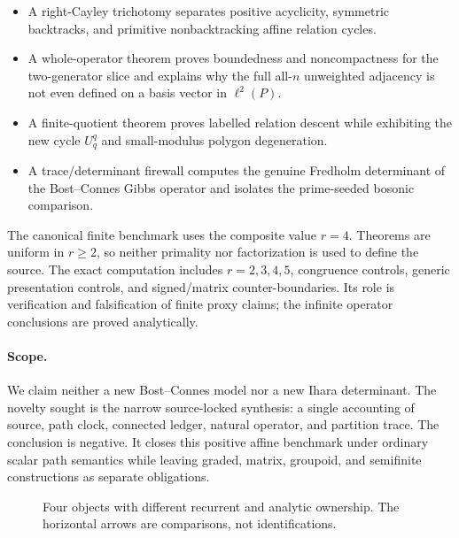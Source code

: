 \begin{itemize}
\item A right-Cayley trichotomy separates positive acyclicity, symmetric
backtracks, and primitive nonbacktracking affine relation cycles.
\item A whole-operator theorem proves boundedness and noncompactness for the
two-generator slice and explains why the full all-$n$ unweighted adjacency is
not even defined on a basis vector in $\ell^2(P)$.
\item A finite-quotient theorem proves labelled relation descent while
exhibiting the new cycle $U_q^q$ and small-modulus polygon degeneration.
\item A trace/determinant firewall computes the genuine Fredholm determinant
of the Bost--Connes Gibbs operator and isolates the prime-seeded bosonic
comparison.
\end{itemize}

The canonical finite benchmark uses the composite value $r=4$.  Theorems are
uniform in $r\ge2$, so neither primality nor factorization is used to define
the source.  The exact computation includes $r=2,3,4,5$, congruence controls,
generic presentation controls, and signed/matrix counter-boundaries.  Its
role is verification and falsification of finite proxy claims; the infinite
operator conclusions are proved analytically.

\paragraph{Scope.}
We claim neither a new Bost--Connes model nor a new Ihara determinant.  The
novelty sought is the narrow source-locked synthesis: a single accounting of
source, path clock, connected ledger, natural operator, and partition trace.
The conclusion is negative.  It closes this positive affine benchmark under
ordinary scalar path semantics while leaving graded, matrix, groupoid, and
semifinite constructions as separate obligations.

\begin{figure}[t]
\centering

\caption{Four objects with different recurrent and analytic ownership.  The
horizontal arrows are comparisons, not identifications.}
\label{fig:firewall}
\end{figure}
